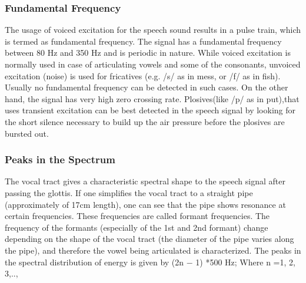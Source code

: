 \documentclass[a4paper,12pt]{report} %
\begin{document}
\subsubsection{Fundamental Frequency }
The usage of voiced excitation for the speech sound results in a pulse train, which is termed as fundamental frequency. The signal has a fundamental frequency between 80 Hz and 350 Hz and is periodic in nature. While voiced excitation is normally used in case of articulating vowels and some of the consonants, unvoiced excitation (noise) is used for fricatives (e.g. /s/ as in mess, or /f/ as in fish). Usually no fundamental frequency can be detected in such cases. On the other hand, the signal has very high zero crossing rate. Plosives(like /p/ as in put),that uses transient excitation can be best detected in the speech signal by looking for the short silence necessary to build up the air pressure before the plosives are bursted out. 
\subsubsection{Peaks in the Spectrum}
The vocal tract gives a characteristic spectral shape to the speech signal after passing the glottis. If one simplifies the vocal tract to a straight pipe (approximately of 17cm length), one can see that the pipe shows resonance at certain frequencies. These frequencies are called formant frequencies. The frequency of the formants (especially of the 1st and 2nd formant) change depending on the shape of the vocal tract (the diameter of the pipe varies along the pipe), and therefore the vowel being articulated is characterized. The peaks in the spectral distribution of energy is given by (2n $-$ 1) *500 Hz; Where n =1, 2, 3,..,
\end{document}
